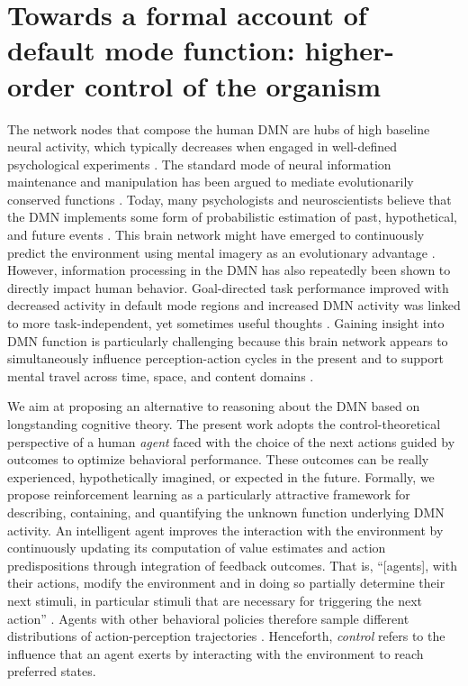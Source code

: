 \documentclass[10pt,letterpaper]{article}
\begin{document}
\section{Towards a formal account of default mode function: higher-order control of the organism}
The network nodes that compose the human DMN
are hubs of high baseline neural activity,
which typically decreases when engaged in well-defined psychological experiments
\citep{raichle_baseline}.
The standard mode of
neural information maintenance and manipulation has
been argued to mediate evolutionarily conserved functions
\citep{brown1914nature, binder1999conceptual, buzsaki2006rhythms}.
Today, many psychologists and neuroscientists believe that
the DMN implements some form of
probabilistic estimation of past, hypothetical, and
future events
\citep{fox2005, hassabis2007patients, schacter2007remembering, binder2009,
randy2008, spreng2009common}.
This brain network
might have emerged to continuously predict the environment using
mental imagery as an evolutionary advantage \citep{suddendorf2007evolution}.
%
However, information processing in the DMN has also repeatedly
been shown to directly impact human behavior. Goal-directed task performance
improved with decreased activity in default mode regions \citep{weiss2006}
and increased DMN activity was linked to more task-independent,
yet sometimes useful thoughts
\citep{mason2007, seli2016mind}.
%
Gaining insight into DMN function is
particularly challenging because
this brain network appears to
simultaneously influence perception-action cycles in the present
and to support mental travel
across time, space, and content domains
\citep{boyer2008evolutionary}.



We aim at proposing an alternative to reasoning about the DMN
based on longstanding cognitive theory.
The present work adopts the control-theoretical perspective of
a human \textit{agent} faced with the choice of the next actions
guided by outcomes to optimize behavioral performance. These outcomes
can be really experienced, hypothetically imagined, or expected in the future.
Formally, we propose reinforcement learning as a particularly attractive framework
for describing, containing, and quantifying the unknown function underlying DMN activity.
An intelligent agent improves the interaction with the environment
by continuously updating its computation of value estimates and action predispositions
through integration of feedback outcomes.
That is, ``[agents], with their actions, modify the environment and in doing so
partially determine their next stimuli, in particular stimuli that are necessary
for triggering the next action''
\citep{pezzulo2011grounding}.
Agents with other behavioral policies therefore sample different
distributions of action-perception trajectories \citep{ghavamzadeh2015bayesian}.
Henceforth,
\textit{control} refers to the influence that an agent exerts by interacting
with the environment to reach preferred states.
\end{document}
